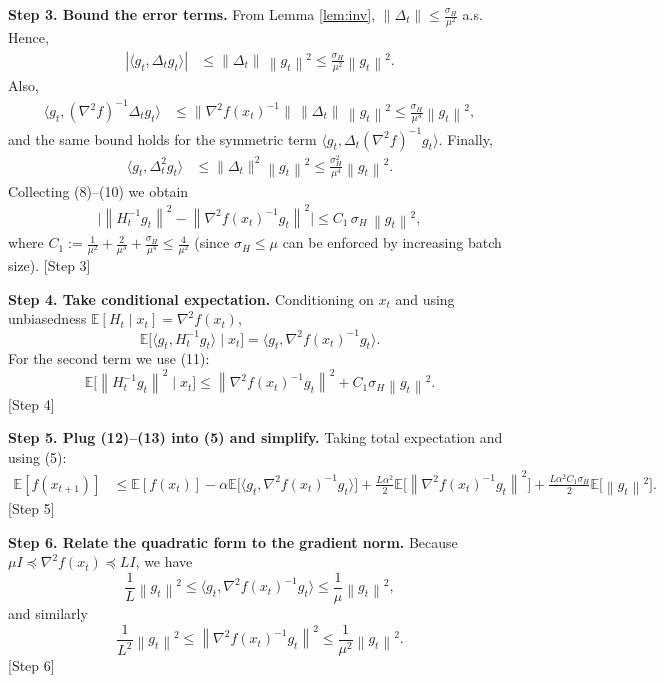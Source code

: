 \documentclass{article}
\newcommand{\E}{\mathbb{E}}
\newcommand{\norm}[1]{\left\|#1\right\|}
\begin{document}
\bigskip
\noindent\textbf{Step 3. Bound the error terms.}  
From Lemma \ref{lem:inv}, $\|\Delta_t\|\le \frac{\sigma_H}{\mu^2}$ a.s. Hence,
\begin{align}
|\langle g_t, \Delta_t g_t\rangle|
&\le \|\Delta_t\|\,\norm{g_t}^2
\le \frac{\sigma_H}{\mu^2}\norm{g_t}^2 . \tag{8}
\end{align}
Also,
\begin{align}
\langle g_t, (\nabla^2 f)^{-1}\Delta_t g_t\rangle
&\le \|\nabla^2 f(x_t)^{-1}\|\,\|\Delta_t\|\,\norm{g_t}^2
\le \frac{\sigma_H}{\mu^3}\norm{g_t}^2 , \tag{9}
\end{align}
and the same bound holds for the symmetric term $\langle g_t,\Delta_t(\nabla^2 f)^{-1}g_t\rangle$.
Finally,
\begin{align}
\langle g_t, \Delta_t^2 g_t\rangle
&\le \|\Delta_t\|^2\norm{g_t}^2
\le \frac{\sigma_H^2}{\mu^4}\norm{g_t}^2 . \tag{10}
\end{align}
Collecting (8)–(10) we obtain
\begin{align}
\big|\norm{H_t^{-1}g_t}^2 - \norm{\nabla^2 f(x_t)^{-1}g_t}^2\big|
\le C_1\,\sigma_H\,\norm{g_t}^2 ,
\tag{11}
\end{align}
where $C_1:=\frac{1}{\mu^2}+\frac{2}{\mu^3}+\frac{\sigma_H}{\mu^4}\le \frac{4}{\mu^2}$ (since $\sigma_H\le \mu$ can be enforced by increasing batch size).  
[Step 3]

\bigskip
\noindent\textbf{Step 4. Take conditional expectation.}  
Conditioning on $x_t$ and using unbiasedness $\E[H_t\mid x_t]=\nabla^2 f(x_t)$,
\[
\E\big[\langle g_t, H_t^{-1}g_t\rangle\mid x_t\big]
= \langle g_t, \nabla^2 f(x_t)^{-1}g_t\rangle .
\tag{12}
\]
For the second term we use (11):
\[
\E\big[\norm{H_t^{-1}g_t}^2\mid x_t\big]
\le \norm{\nabla^2 f(x_t)^{-1}g_t}^2 + C_1\sigma_H \norm{g_t}^2 .
\tag{13}
\]
[Step 4]

\bigskip
\noindent\textbf{Step 5. Plug (12)–(13) into (5) and simplify.}  
Taking total expectation and using (5):
\begin{align}
\E[f(x_{t+1})] 
&\le \E[f(x_t)] 
   -\alpha \E\!\big[\langle g_t, \nabla^2 f(x_t)^{-1}g_t\rangle\big]
   +\frac{L\alpha^2}{2}\E\!\big[\norm{\nabla^2 f(x_t)^{-1}g_t}^2\big]
   +\frac{L\alpha^2 C_1\sigma_H}{2}\E\!\big[\norm{g_t}^2\big].
\tag{14}
\end{align}
[Step 5]

\bigskip
\noindent\textbf{Step 6. Relate the quadratic form to the gradient norm.}  
Because $\mu I \preceq \nabla^2 f(x_t) \preceq L I$, we have
\[
\frac{1}{L}\norm{g_t}^2 \le \langle g_t, \nabla^2 f(x_t)^{-1}g_t\rangle
\le \frac{1}{\mu}\norm{g_t}^2 ,
\tag{15}
\]
and similarly
\[
\frac{1}{L^2}\norm{g_t}^2 \le \norm{\nabla^2 f(x_t)^{-1}g_t}^2
\le \frac{1}{\mu^2}\norm{g_t}^2 .
\tag{16}
\]
[Step 6]
\end{document}
